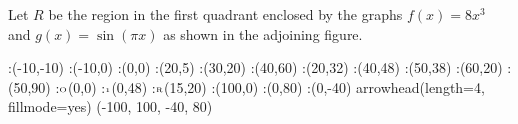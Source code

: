 \question Let $R$ be the region in the first quadrant enclosed by the graphs $f(x)=8x^3$ and 
$g(x)= \sin(\pi x)$ as shown in the adjoining figure.	

\insertQR{}


  \begin{marginfigure}
      :(-10,-10)
      :(-10,0)
      :(0,0)
      :(20,5)
      :(30,20)
      :(40,60)
      :(20,32)
      :(40,48)
      :(50,38)
      :(60,20)
      :(50,90)
      \def\Xmax{100}
      \def\Ymax{80}
      \def\Xmin{-100}
      \def\Ymin{-40}
      :$\tiny\text{O}$(0,0)
      :$\tiny\text{1}$(0,48)
      :$\tiny\text{R}$(15,20)
      :(\Xmax,0)
      :(0,\Ymax)
      :(0,\Ymin)
    \figdrawbegin{}
      \figset arrowhead(length=4, fillmode=yes)
      (\Xmin, \Xmax, \Ymin, \Ymax)
      \figdrawcurve [1,10,50,60,70,80]
      \figdrawcurve [2,10,20,30,40,90]
    \figdrawend
    \centerline{\box\figBoxA}
  \end{marginfigure}

